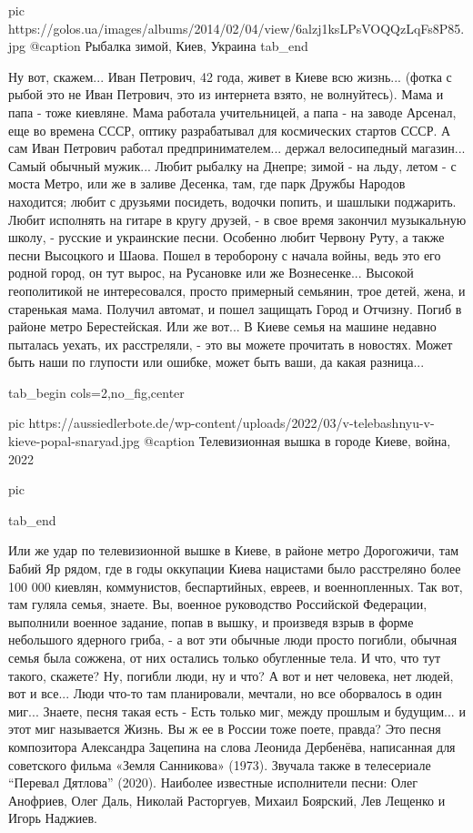 		 pic https://golos.ua/images/albums/2014/02/04/view/6alzj1ksLPsVOQQzLqFs8P85.jpg
		 @caption Рыбалка зимой, Киев, Украина
  tab_end
\fi

Ну вот, скажем...  Иван Петрович, 42 года, живет в Киеве всю жизнь... (фотка с
рыбой это не Иван Петрович, это из интернета взято, не волнуйтесь). Мама и папа
- тоже киевляне.  Мама работала учительницей, а папа - на заводе Арсенал, еще
во времена СССР, оптику разрабатывал для космических стартов СССР.  А сам Иван
Петрович работал предпринимателем... держал велосипедный магазин... Самый
обычный мужик...  Любит рыбалку на Днепре; зимой - на льду, летом - с моста
Метро, или же в заливе Десенка, там, где парк Дружбы Народов находится; любит с
друзьями посидеть, водочки попить, и шашлыки поджарить.  Любит исполнять на
гитаре в кругу друзей, - в свое время закончил музыкальную школу, - русские и
украинские песни.  Особенно любит Червону Руту, а также песни Высоцкого и
Шаова.  Пошел в тероборону с начала войны, ведь это его родной город, он тут
вырос, на Русановке или же Вознесенке... Высокой геополитикой не интересовался,
просто примерный семьянин, трое детей, жена, и старенькая мама.  Получил
автомат, и пошел защищать Город и Отчизну. Погиб в районе метро Берестейская.
Или же вот... В Киеве семья на машине недавно пыталась уехать, их расстреляли,
- это вы можете прочитать в новостях. Может быть наши по глупости или ошибке,
может быть ваши, да какая разница... 

\ifcmt
  tab_begin cols=2,no_fig,center

     pic https://aussiedlerbote.de/wp-content/uploads/2022/03/v-telebashnyu-v-kieve-popal-snaryad.jpg
		 @caption Телевизионная вышка в городе Киеве, война, 2022

		 pic 

  tab_end
\fi

Или же удар по телевизионной вышке в
Киеве, в районе метро Дорогожичи, там Бабий Яр рядом, где в годы оккупации
Киева нацистами было расстреляно более 100 000 киевлян, коммунистов,
беспартийных, евреев, и военнопленных. Так вот, там гуляла семья, знаете. Вы,
военное руководство Российской Федерации, выполнили военное задание, попав в
вышку, и произведя взрыв в форме небольшого ядерного гриба, - а вот эти обычные
люди просто погибли, обычная семья была сожжена, от них остались только
обугленные тела.  И что, что тут такого, скажете? Ну, погибли люди, ну и что? А
вот и нет человека, нет людей, вот и все... Люди что-то там планировали,
мечтали, но все оборвалось в один миг...  Знаете, песня такая есть - Есть
только миг, между прошлым и будущим...  и этот миг называется Жизнь. Вы ж ее в
России тоже поете, правда?  Это песня композитора Александра Зацепина на слова
Леонида Дербенёва, написанная для советского фильма «Земля Санникова» (1973).
Звучала также в телесериале \enquote{Перевал Дятлова} (2020). Наиболее
известные исполнители песни: Олег Анофриев, Олег Даль, Николай Расторгуев,
Михаил Боярский, Лев Лещенко и Игорь Наджиев.

